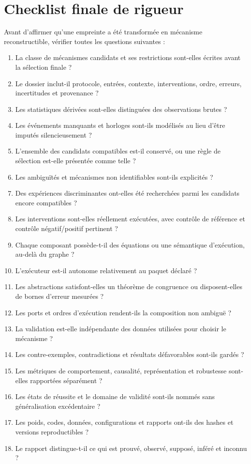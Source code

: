 \documentclass[11pt,oneside]{book}
\theoremstyle{definition}
\theoremstyle{remark}
\newcommand{\1}{\mathbf 1}
\begin{document}
\section*{Checklist finale de rigueur}
Avant d'affirmer qu'une empreinte a été transformée en mécanisme reconstructible, vérifier toutes les questions suivantes :
\begin{enumerate}[label=\textbf{R\arabic*.}]
\item La classe de mécanismes candidats et ses restrictions sont-elles écrites avant la sélection finale ?
\item Le dossier inclut-il protocole, entrées, contexte, interventions, ordre, erreurs, incertitudes et provenance ?
\item Les statistiques dérivées sont-elles distinguées des observations brutes ?
\item Les événements manquants et horloges sont-ils modélisés au lieu d'être imputés silencieusement ?
\item L'ensemble des candidats compatibles est-il conservé, ou une règle de sélection est-elle présentée comme telle ?
\item Les ambiguïtés et mécanismes non identifiables sont-ils explicités ?
\item Des expériences discriminantes ont-elles été recherchées parmi les candidats encore compatibles ?
\item Les interventions sont-elles réellement exécutées, avec contrôle de référence et contrôle négatif/positif pertinent ?
\item Chaque composant possède-t-il des équations ou une sémantique d'exécution, au-delà du graphe ?
\item L'exécuteur est-il autonome relativement au paquet déclaré ?
\item Les abstractions satisfont-elles un théorème de congruence ou disposent-elles de bornes d'erreur mesurées ?
\item Les ports et ordres d'exécution rendent-ils la composition non ambiguë ?
\item La validation est-elle indépendante des données utilisées pour choisir le mécanisme ?
\item Les contre-exemples, contradictions et résultats défavorables sont-ils gardés ?
\item Les métriques de comportement, causalité, représentation et robustesse sont-elles rapportées séparément ?
\item Les états de réussite et le domaine de validité sont-ils nommés sans généralisation excédentaire ?
\item Les poids, codes, données, configurations et rapports ont-ils des hashes et versions reproductibles ?
\item Le rapport distingue-t-il ce qui est prouvé, observé, supposé, inféré et inconnu ?
\end{enumerate}
\end{document}
